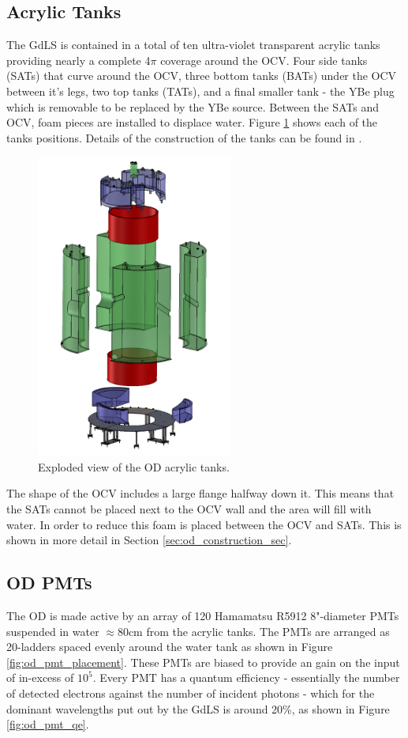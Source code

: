\subsection{Acrylic Tanks}
\par
The GdLS is contained in a total of ten ultra-violet transparent acrylic tanks providing nearly a complete 4$\pi$ coverage around the OCV.
Four side tanks (SATs) that curve around the OCV, three bottom tanks (BATs) under the OCV between it's legs, two top tanks (TATs), and a final smaller tank - the YBe plug which is removable to be replaced by the YBe source.
Between the SATs and OCV, foam pieces are installed to displace water.
Figure \ref{fig:LZ_OD_Tanks} shows each of the tanks positions.
Details of the construction of the tanks can be found in \cite{scotthaselschwardt_thesis_ref}.
\begin{figure}
    \centering
    \includegraphics[height=10cm]{Figures/LZ/OD_Tanks_CAD.png}
    \caption{Exploded view of the OD acrylic tanks.}
    \label{fig:LZ_OD_Tanks}
\end{figure}

\par
The shape of the OCV includes a large flange halfway down it. 
This means that the SATs cannot be placed next to the OCV wall and the area will fill with water.
In order to reduce this foam is placed between the OCV and SATs.
This is shown in more detail in Section \ref{sec:od_construction_sec}.

\subsection{OD PMTs}
\par
The OD is made active by an array of 120 Hamamatsu R5912 8"-diameter PMTs suspended in water $\approx$80cm from the acrylic tanks.
The PMTs are arranged as 20-ladders spaced evenly around the water tank as shown in Figure \ref{fig:od_pmt_placement}.
These PMTs are biased to provide an gain on the input of in-excess of $10^{5}$.
Every PMT has a quantum efficiency - essentially the number of detected electrons against the number of incident photons - which for the dominant wavelengths put out by the GdLS is around 20\%, as shown in Figure \ref{fig:od_pmt_qe}.

